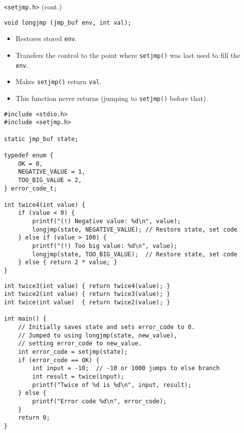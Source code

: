 \documentclass[aspectratio=169,14pt]{beamer}
\begin{document}
\begin{frame}[fragile]{\texttt{<setjmp.h>} (cont.)}
\begin{lstlisting}[style=cstyle]
void longjmp (jmp_buf env, int val);
\end{lstlisting}
\begin{itemize}
    \item Restores stored \texttt{env}.
    \item Transfers the control to the point where \texttt{setjmp()} was last used to fill the \texttt{env}.
    \item Makes \texttt{setjmp()} return \texttt{val}.
    \item This function never returns (jumping to \texttt{setjmp()} before that).
\end{itemize}
\end{frame}



\begin{frame}[fragile]{}
\begin{lstlisting}[style=cstyle]
#include <stdio.h>
#include <setjmp.h>

static jmp_buf state;

typedef enum {
    OK = 0,
    NEGATIVE_VALUE = 1,
    TOO_BIG_VALUE = 2,
} error_code_t;

int twice4(int value) {
    if (value < 0) {
        printf("(!) Negative value: %d\n", value);
        longjmp(state, NEGATIVE_VALUE); // Restore state, set code
    } else if (value > 100) {
        printf("(!) Too big value: %d\n", value);
        longjmp(state, TOO_BIG_VALUE);  // Restore state, set code
    } else { return 2 * value; }
}
\end{lstlisting}
\end{frame}



\begin{frame}[fragile]{}
\begin{lstlisting}[style=cstyle]
int twice3(int value) { return twice4(value); }
int twice2(int value) { return twice3(value); }
int twice(int value)  { return twice2(value); }

int main() {
    // Initially saves state and sets error_code to 0.
    // Jumped to using longjmp(state, new_value),
    // setting error_code to new_value.
    int error_code = setjmp(state);
    if (error_code == OK) {
        int input = -10;  // -10 or 1000 jumps to else branch
        int result = twice(input);
        printf("Twice of %d is %d\n", input, result);
    } else {
        printf("Error code %d\n", error_code);
    }
    return 0;
}
\end{lstlisting}
\end{frame}
\end{document}
